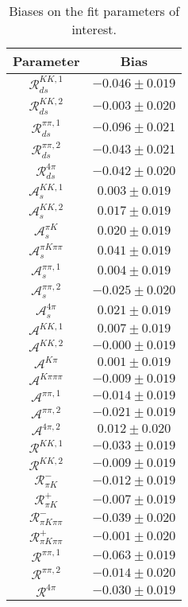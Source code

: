 \begin{table}
  \centering
  \small
  \begin{tabular}{cc}
  \toprule
      Parameter & Bias \\
  \midrule
      $\mathcal{R}_{ds}^{KK,1}$ & $-0.046 \pm 0.019$ \\
      $\mathcal{R}_{ds}^{KK,2}$ & $-0.003 \pm 0.020$ \\
      $\mathcal{R}_{ds}^{\pi\pi,1}$ & $-0.096 \pm 0.021$ \\
      $\mathcal{R}_{ds}^{\pi\pi,2}$ & $-0.043 \pm 0.021$ \\
      $\mathcal{R}_{ds}^{4\pi}$ & $-0.042 \pm 0.020$ \\
      $\mathcal{A}_s^{KK,1}$ & $0.003 \pm 0.019$ \\
      $\mathcal{A}_s^{KK,2}$ & $0.017 \pm 0.019$ \\
      $\mathcal{A}_s^{\pi K}$ & $0.020 \pm 0.019$ \\
      $\mathcal{A}_s^{\pi K\pi\pi}$ & $0.041 \pm 0.019$ \\
      $\mathcal{A}_s^{\pi\pi,1}$ & $0.004 \pm 0.019$ \\
      $\mathcal{A}_s^{\pi\pi,2}$ & $-0.025 \pm 0.020$ \\
      $\mathcal{A}_s^{4\pi}$ & $0.021 \pm 0.019$ \\
      $\mathcal{A}^{KK,1}$ & $0.007 \pm 0.019$ \\
      $\mathcal{A}^{KK,2}$ & $-0.000 \pm 0.019$ \\
      $\mathcal{A}^{K\pi}$ & $0.001 \pm 0.019$ \\
      $\mathcal{A}^{K\pi\pi\pi}$ & $-0.009 \pm 0.019$ \\
      $\mathcal{A}^{\pi\pi,1}$ & $-0.014 \pm 0.019$ \\
      $\mathcal{A}^{\pi\pi,2}$ & $-0.021 \pm 0.019$ \\
      $\mathcal{A}^{4\pi,2}$ & $0.012 \pm 0.020$ \\
      $\mathcal{R}^{KK,1}$ & $-0.033 \pm 0.019$ \\
      $\mathcal{R}^{KK,2}$ & $-0.009 \pm 0.019$ \\
      $\mathcal{R}_{\pi K}^-$ & $-0.012 \pm 0.019$ \\
      $\mathcal{R}_{\pi K}^+$ & $-0.007 \pm 0.019$ \\
      $\mathcal{R}_{\pi K\pi\pi}^-$ & $-0.039 \pm 0.020$ \\
      $\mathcal{R}_{\pi K\pi\pi}^+$ & $-0.001 \pm 0.020$ \\
      $\mathcal{R}^{\pi\pi,1}$ & $-0.063 \pm 0.019$ \\
      $\mathcal{R}^{\pi\pi,2}$ & $-0.014 \pm 0.020$ \\
      $\mathcal{R}^{4\pi}$ & $-0.030 \pm 0.019$ \\
      \bottomrule
  \end{tabular}
  \caption{Biases on the fit parameters of interest.}
\label{tab:biases}
\end{table}
